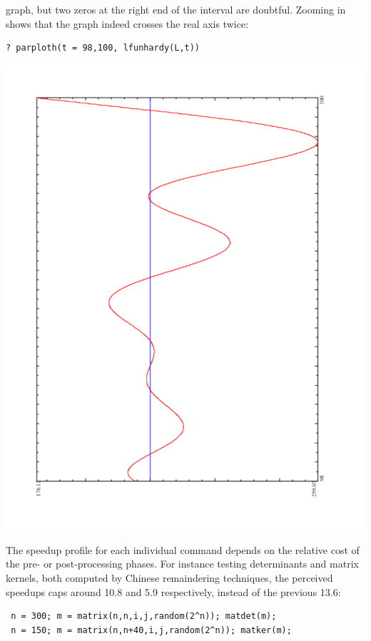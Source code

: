 \documentclass{deliverablereport}
\begin{document}
graph, but two zeros at the right end of the interval are doubtful. Zooming
in shows that the graph indeed crosses the real axis twice:
\begin{verbatim}
? parploth(t = 98,100, lfunhardy(L,t))
\end{verbatim}
\begin{center}
\includegraphics[scale=0.45,angle=-90]{L2.pdf}
\end{center}

The speedup profile for each individual command depends on the relative cost
of the pre- or post-processing phases. For instance testing determinants and
matrix kernels, both computed by Chinese remaindering techniques, the
perceived speedups caps around 10.8 and 5.9 respectively, instead of the
previous 13.6:

\begin{verbatim}
 n = 300; m = matrix(n,n,i,j,random(2^n)); matdet(m);
 n = 150; m = matrix(n,n+40,i,j,random(2^n)); matker(m);
\end{verbatim}
\begin{center}
\end{center}
\end{document}
